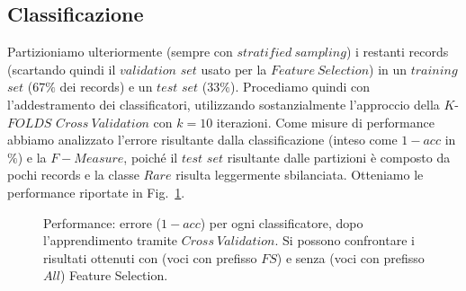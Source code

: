 \documentclass[fleqn,10pt]{SelfArx} %
\begin{document}
\subsection{Classificazione}

Partizioniamo ulteriormente (sempre con $stratified\ sampling$) i restanti records (scartando quindi il $validation$ $set$ usato per la $Feature\ Selection$) in un $training$ $set$ ($67\%$ dei records) e un $test$ $set$ ($33\%$).
Procediamo quindi con l'addestramento dei classificatori, utilizzando sostanzialmente l'approccio della $K$-$FOLDS$ $Cross\ Validation$ con $k=10$ iterazioni. Come misure di performance abbiamo analizzato l'errore risultante dalla classificazione (inteso come $1-acc$ in $\%$) e la $F-Measure$, poiché il $test$ $set$ risultante dalle partizioni è composto da pochi records e la classe $Rare$ risulta leggermente sbilanciata.
Otteniamo le performance riportate in Fig.~\ref{error:fig}. %
\begin{figure}
\caption{ \label{error:fig} Performance: errore ($1-acc $) per ogni classificatore, dopo l'apprendimento tramite $Cross\ Validation$.
Si possono confrontare i risultati ottenuti con (voci con prefisso $FS$) e senza (voci con prefisso $All$) Feature Selection.}
\end{figure}
\end{document}
